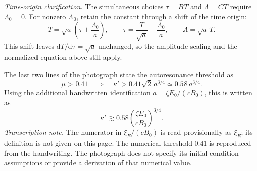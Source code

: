 \documentclass[11pt,a4paper]{article}
\newcommand{\dd}{\mathrm{d}}
\begin{document}
\textit{Time-origin clarification.} The simultaneous choices $\tau=BT$
and $\Lambda=CT$ require $\Lambda_0=0$. For nonzero $\Lambda_0$, retain
the constant through a shift of the time origin:
\begin{equation}
\boxed{T=\sqrt a\left(\tau+\frac{\Lambda_0}{a}\right),\qquad
\tau=\frac{T}{\sqrt a}-\frac{\Lambda_0}{a},\qquad
\Lambda=\sqrt a\,T.}
\end{equation}
This shift leaves $\dd T/\dd\tau=\sqrt a$ unchanged, so the amplitude
scaling and the normalized equation above still apply.

The last two lines of the photograph state the autoresonance threshold as
\begin{equation}
\mu>0.41
\quad\Longrightarrow\quad
\kappa'>0.41\sqrt{2}\,a^{3/4}\simeq0.58\,a^{3/4}.
\end{equation}
Using the additional handwritten identification $a=\zeta E_0/(cB_0)$,
this is written as
\begin{equation}
\boxed{\kappa'\gtrsim0.58\left(\frac{\zeta E_0}{cB_0}\right)^{3/4}.}
\end{equation}
\textit{Transcription note.} The numerator in $\xi_E/(cB_0)$ is read
provisionally as $\xi_E$; its definition is not given on this page.
The numerical threshold $0.41$ is reproduced from the handwriting.
The photograph does not specify its initial-condition assumptions or
provide a derivation of that numerical value.
\end{document}
